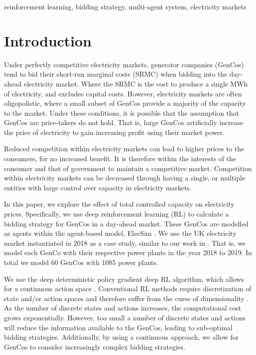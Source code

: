 \documentclass[conference]{IEEEtran}
\begin{document}
\begin{IEEEkeywords}
reinforcement learning, bidding strategy, multi-agent system, electricity markets
\end{IEEEkeywords}

\section{Introduction}

Under perfectly competitive electricity markets, generator companies (GenCos) tend to bid their short-run marginal costs (SRMC) when bidding into the day-ahead electricity market. Where the SRMC is the cost to produce a single MWh of electricity, and excludes capital costs. However, electricity markets are often oligopolistic, where a small subset of GenCos provide a majority of the capacity to the market. Under these conditions, it is possible that the assumption that GenCos are price-takers do not hold. That is, large GenCos artificially increase the price of electricity to gain increasing profit using their market power. 

Reduced competition within electricity markets can lead to higher prices to the consumers, for no increased benefit. It is therefore within the interests of the consumer and that of government to maintain a competitive market. Competition within electricity markets can be decreased through having a single, or multiple entities with large control over capacity in electricity markets. 

In this paper, we explore the effect of total controlled capacity on electricity prices. Specifically, we use deep reinforcement learning (RL) to calculate a bidding strategy for GenCos in a day-ahead market. These GenCos are modelled as agents within the agent-based model, ElecSim \cite{Kell}. We use the UK electricity market instantiated in 2018 as a case study, similar to our work in \cite{Kell2019a}. That is, we model each GenCo with their respective power plants in the year 2018 to 2019. In total we model 60 GenCos with 1085 power plants.

We use the deep deterministic policy gradient deep RL algorithm, which allows for a continuous action space \cite{Hunt2016}. Conventional RL methods require discretization of state and/or action spaces and therefore suffer from the curse of dimensionality \cite{Ye2020a}. As the number of discrete states and actions increases, the computational cost grows exponentially. However, too small a number of discrete states and actions will reduce the information available to the GenCos, leading to sub-optimal bidding strategies. Additionally, by using a continuous approach, we allow for GenCos to consider increasingly complex bidding strategies. 
\end{document}
